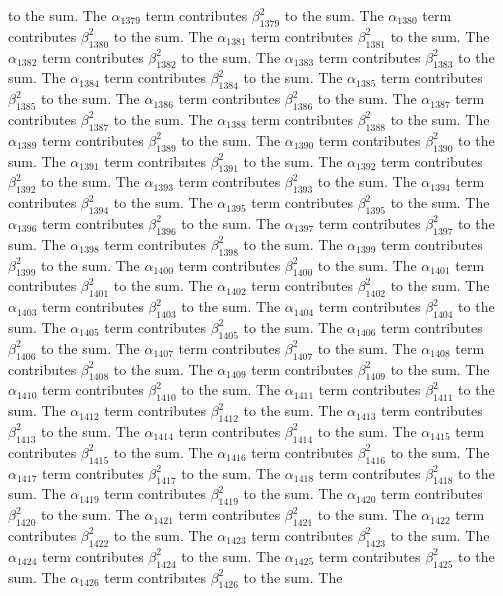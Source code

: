 \begin{lemma}
to the sum. The $\alpha_{1379}$ term contributes $\beta_{1379}^{2}$ to the sum. The $\alpha_{1380}$ term contributes $\beta_{1380}^{2}$ to the sum. The $\alpha_{1381}$ term contributes $\beta_{1381}^{2}$ to the sum. The $\alpha_{1382}$ term contributes $\beta_{1382}^{2}$ to the sum. The $\alpha_{1383}$ term contributes $\beta_{1383}^{2}$ to the sum. The $\alpha_{1384}$ term contributes $\beta_{1384}^{2}$ to the sum. The $\alpha_{1385}$ term contributes $\beta_{1385}^{2}$ to the sum. The $\alpha_{1386}$ term contributes $\beta_{1386}^{2}$ to the sum. The $\alpha_{1387}$ term contributes $\beta_{1387}^{2}$ to the sum. The $\alpha_{1388}$ term contributes $\beta_{1388}^{2}$ to the sum. The $\alpha_{1389}$ term contributes $\beta_{1389}^{2}$ to the sum. The $\alpha_{1390}$ term contributes $\beta_{1390}^{2}$ to the sum. The $\alpha_{1391}$ term contributes $\beta_{1391}^{2}$ to the sum. The $\alpha_{1392}$ term contributes $\beta_{1392}^{2}$ to the sum. The $\alpha_{1393}$ term contributes $\beta_{1393}^{2}$ to the sum. The $\alpha_{1394}$ term contributes $\beta_{1394}^{2}$ to the sum. The $\alpha_{1395}$ term contributes $\beta_{1395}^{2}$ to the sum. The $\alpha_{1396}$ term contributes $\beta_{1396}^{2}$ to the sum. The $\alpha_{1397}$ term contributes $\beta_{1397}^{2}$ to the sum. The $\alpha_{1398}$ term contributes $\beta_{1398}^{2}$ to the sum. The $\alpha_{1399}$ term contributes $\beta_{1399}^{2}$ to the sum. The $\alpha_{1400}$ term contributes $\beta_{1400}^{2}$ to the sum. The $\alpha_{1401}$ term contributes $\beta_{1401}^{2}$ to the sum. The $\alpha_{1402}$ term contributes $\beta_{1402}^{2}$ to the sum. The $\alpha_{1403}$ term contributes $\beta_{1403}^{2}$ to the sum. The $\alpha_{1404}$ term contributes $\beta_{1404}^{2}$ to the sum. The $\alpha_{1405}$ term contributes $\beta_{1405}^{2}$ to the sum. The $\alpha_{1406}$ term contributes $\beta_{1406}^{2}$ to the sum. The $\alpha_{1407}$ term contributes $\beta_{1407}^{2}$ to the sum. The $\alpha_{1408}$ term contributes $\beta_{1408}^{2}$ to the sum. The $\alpha_{1409}$ term contributes $\beta_{1409}^{2}$ to the sum. The $\alpha_{1410}$ term contributes $\beta_{1410}^{2}$ to the sum. The $\alpha_{1411}$ term contributes $\beta_{1411}^{2}$ to the sum. The $\alpha_{1412}$ term contributes $\beta_{1412}^{2}$ to the sum. The $\alpha_{1413}$ term contributes $\beta_{1413}^{2}$ to the sum. The $\alpha_{1414}$ term contributes $\beta_{1414}^{2}$ to the sum. The $\alpha_{1415}$ term contributes $\beta_{1415}^{2}$ to the sum. The $\alpha_{1416}$ term contributes $\beta_{1416}^{2}$ to the sum. The $\alpha_{1417}$ term contributes $\beta_{1417}^{2}$ to the sum. The $\alpha_{1418}$ term contributes $\beta_{1418}^{2}$ to the sum. The $\alpha_{1419}$ term contributes $\beta_{1419}^{2}$ to the sum. The $\alpha_{1420}$ term contributes $\beta_{1420}^{2}$ to the sum. The $\alpha_{1421}$ term contributes $\beta_{1421}^{2}$ to the sum. The $\alpha_{1422}$ term contributes $\beta_{1422}^{2}$ to the sum. The $\alpha_{1423}$ term contributes $\beta_{1423}^{2}$ to the sum. The $\alpha_{1424}$ term contributes $\beta_{1424}^{2}$ to the sum. The $\alpha_{1425}$ term contributes $\beta_{1425}^{2}$ to the sum. The $\alpha_{1426}$ term contributes $\beta_{1426}^{2}$ to the sum. The 
\end{lemma}
